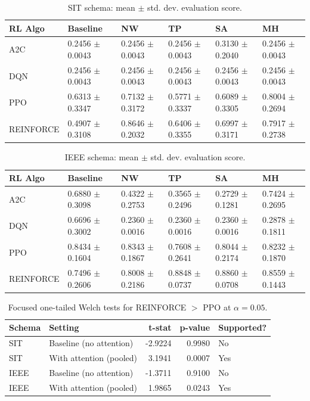\documentclass[sn-basic]{sn-jnl}%
\begin{document}
\begin{table}[htbp]
	\centering
	\caption{SIT schema: mean $\pm$ std. dev. evaluation score.}
	\label{tab:sit_main_results}
	\begin{tabular}{l l l l l l}
	\toprule
	\textbf{RL Algo} & \textbf{Baseline} & \textbf{NW} & \textbf{TP} & \textbf{SA} & \textbf{MH}\\
	\midrule
	A2C & 0.2456 $\pm$ 0.0043 & 0.2456 $\pm$ 0.0043 & 0.2456 $\pm$ 0.0043 & 0.3130 $\pm$ 0.2040 & 0.2456 $\pm$ 0.0043\\
	DQN & 0.2456 $\pm$ 0.0043 & 0.2456 $\pm$ 0.0043 & 0.2456 $\pm$ 0.0043 & 0.2456 $\pm$ 0.0043 & 0.2456 $\pm$ 0.0043\\
	PPO & 0.6313 $\pm$ 0.3347 & 0.7132 $\pm$ 0.3172 & 0.5771 $\pm$ 0.3337 & 0.6089 $\pm$ 0.3305 & 0.8004 $\pm$ 0.2694\\
	REINFORCE & 0.4907 $\pm$ 0.3108 & 0.8646 $\pm$ 0.2032 & 0.6406 $\pm$ 0.3355 & 0.6997 $\pm$ 0.3171 & 0.7917 $\pm$ 0.2738\\
	\bottomrule
	\end{tabular}
\end{table}

\begin{table}[htbp]
	\centering
	\caption{IEEE schema: mean $\pm$ std. dev. evaluation score.}
	\label{tab:ieee_main_results}
	\begin{tabular}{l l l l l l}
	\toprule
	\textbf{RL Algo} & \textbf{Baseline} & \textbf{NW} & \textbf{TP} & \textbf{SA} & \textbf{MH}\\
	\midrule
	A2C & 0.6880 $\pm$ 0.3098 & 0.4322 $\pm$ 0.2753 & 0.3565 $\pm$ 0.2496 & 0.2729 $\pm$ 0.1281 & 0.7424 $\pm$ 0.2695\\
	DQN & 0.6696 $\pm$ 0.3002 & 0.2360 $\pm$ 0.0016 & 0.2360 $\pm$ 0.0016 & 0.2360 $\pm$ 0.0016 & 0.2878 $\pm$ 0.1811\\
	PPO & 0.8434 $\pm$ 0.1604 & 0.8343 $\pm$ 0.1867 & 0.7608 $\pm$ 0.2641 & 0.8044 $\pm$ 0.2174 & 0.8232 $\pm$ 0.1870\\
	REINFORCE & 0.7496 $\pm$ 0.2606 & 0.8008 $\pm$ 0.2186 & 0.8848 $\pm$ 0.0737 & 0.8860 $\pm$ 0.0708 & 0.8559 $\pm$ 0.1443\\
	\bottomrule
	\end{tabular}
\end{table}

\begin{table}[htbp]
	\centering
	\caption{Focused one-tailed Welch tests for \textsc{REINFORCE} $>$ \textsc{PPO} at $\alpha=0.05$.}
	\label{tab:rf_vs_ppo_tests}
	\begin{tabular}{l l r r l}
	\toprule
	\textbf{Schema} & \textbf{Setting} & \textbf{t-stat} & \textbf{p-value} & \textbf{Supported?}\\
	\midrule
	SIT & Baseline (no attention) & -2.9224 & 0.9980 & No\\
	SIT & With attention (pooled) & 3.1941 & 0.0007 & Yes\\
	IEEE & Baseline (no attention) & -1.3711 & 0.9100 & No\\
	IEEE & With attention (pooled) & 1.9865 & 0.0243 & Yes\\
	\bottomrule
	\end{tabular}
\end{table}
\end{document}
